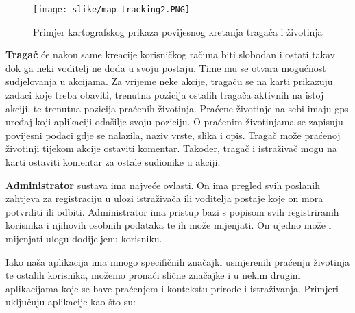 		\begin{figure}[H]
			\texttt{[image: slike/map\_tracking2.PNG]} %
			\centering
			\caption{Primjer kartografskog prikaza povijesnog kretanja tragača i životinja}
			\label{fig:promjene}
		\end{figure}
		
		\textbf{Tragač} će nakon same kreacije korisničkog računa biti slobodan i ostati takav dok ga neki voditelj ne doda u svoju postaju. Time mu se otvara mogućnost sudjelovanja u akcijama. Za vrijeme neke akcije, tragaču se na karti prikazuju zadaci koje treba obaviti, trenutna pozicija ostalih tragača aktivnih na istoj akciji, te trenutna pozicija praćenih životinja. Praćene životinje na sebi imaju gps uređaj koji aplikaciji odašilje svoju poziciju. O
		praćenim životinjama se zapisuju povijesni podaci gdje se nalazila, naziv vrste, slika i opis. Tragač može praćenoj životinji tijekom akcije ostaviti komentar. Također, tragač i istraživač mogu na karti ostaviti komentar za ostale sudionike u akciji.		
		
		\textbf{Administrator} sustava ima najveće ovlasti. On ima pregled svih poslanih zahtjeva za registraciju u ulozi istraživača ili voditelja postaje koje on mora potvrditi ili odbiti. Administrator ima pristup bazi s popisom svih registriranih korisnika i njihovih osobnih podataka te ih može mijenjati. On ujedno može i mijenjati ulogu dodijeljenu korisniku.
\vspace{12pt}

		Iako naša aplikacija ima mnogo specifičnih značajki usmjerenih praćenju životinja te ostalih korisnika, možemo pronaći slične značajke i u nekim drugim aplikacijama koje se bave praćenjem i kontekstu prirode i istraživanja. Primjeri uključuju aplikacije kao što su:
		
